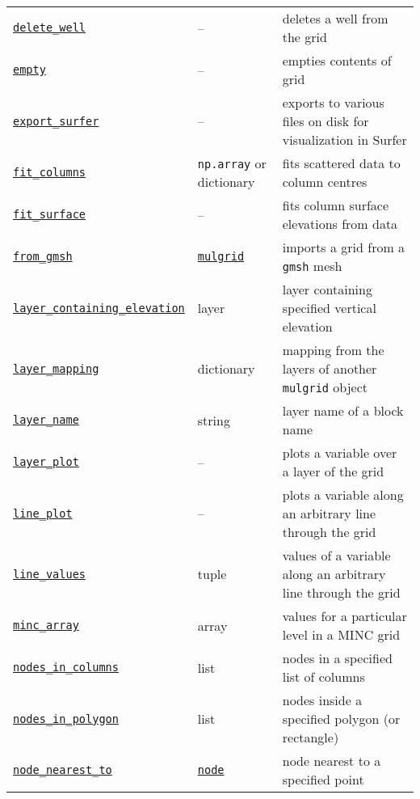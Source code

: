 \begin{center}
\begin{longtable}{|l|l|p{70mm}|}
  \hyperref[sec:mulgrid:delete_well]{\texttt{delete\_well}} & -- & deletes a well from the grid\\ 
  \hyperref[sec:mulgrid:empty]{\texttt{empty}} & --  & empties contents of grid\\
  \hyperref[sec:mulgrid:export_surfer]{\texttt{export\_surfer}} & -- & exports to various files on disk for visualization in Surfer\\ 
  \hyperref[sec:mulgrid:fit_columns]{\texttt{fit\_columns}} & \texttt{np.array} or dictionary & fits scattered data to column centres\\ 
  \hyperref[sec:mulgrid:fit_surface]{\texttt{fit\_surface}} & -- & fits column surface elevations from data\\ 
  \hyperref[sec:mulgrid:from_gmsh]{\texttt{from\_gmsh}} & \hyperref[mulgrids]{\texttt{mulgrid}} & imports a grid from a \texttt{gmsh} mesh\\ 
  \hyperref[sec:mulgrid:layer_containing_elevation]{\texttt{layer\_containing\_elevation}} & layer & layer containing specified vertical elevation\\
  \hyperref[sec:mulgrid:layer_mapping]{\texttt{layer\_mapping}} & dictionary & mapping from the layers of another \texttt{mulgrid} object\\
  \hyperref[sec:mulgrid:layer_name]{\texttt{layer\_name}} & string & layer name of a block name\\ 
  \hyperref[sec:mulgrid:layer_plot]{\texttt{layer\_plot}} & -- & plots a variable over a layer of the grid\\
  \hyperref[sec:mulgrid:line_plot]{\texttt{line\_plot}} & -- & plots a variable along an arbitrary line through the grid\\
  \hyperref[sec:mulgrid:line_values]{\texttt{line\_values}} & tuple & values of a variable along an arbitrary line through the grid\\
  \hyperref[sec:mulgrid:minc_array]{\texttt{minc\_array}} & array & values for a particular level in a MINC grid\\ 
  \hyperref[sec:mulgrid:nodes_in_columns]{\texttt{nodes\_in\_columns}} & list & nodes in a specified list of columns\\ 
  \hyperref[sec:mulgrid:nodes_in_polygon]{\texttt{nodes\_in\_polygon}} & list & nodes inside a specified polygon (or rectangle)\\ 
  \hyperref[sec:mulgrid:node_nearest_to]{\texttt{node\_nearest\_to}} & \hyperref[nodeobjects]{\texttt{node}} & node nearest to a specified point\\ 

\end{longtable}
\end{center}
